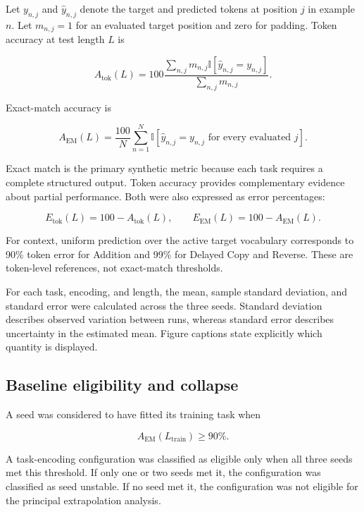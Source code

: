 \documentclass[
    author={Aanchala Ravindra Bhongade},
    supervisor={Dr. Fernando Moreno-Pino},
    degree={MSc},
    title={Length Generalisation in Transformer-Based Sequence Models: Failure Taxonomy and Mitigation Strategies},
    subtitle={},
    type={},
    year={2026}
]{dissertation}
\begin{document}
Let \(y_{n,j}\) and \(\hat{y}_{n,j}\) denote the target and predicted tokens at position \(j\) in example \(n\). Let \(m_{n,j}=1\) for an evaluated target position and zero for padding. Token accuracy at test length \(L\) is

\begin{equation}
A_{\mathrm{tok}}(L)
=
100
\frac{
\sum_{n,j}
m_{n,j}
\mathbb{I}[\hat{y}_{n,j}=y_{n,j}]
}{
\sum_{n,j}m_{n,j}
}.
\label{eq:token-accuracy}
\end{equation}

Exact-match accuracy is

\begin{equation}
A_{\mathrm{EM}}(L)
=
\frac{100}{N}
\sum_{n=1}^{N}
\mathbb{I}
\left[
\hat{y}_{n,j}=y_{n,j}
\text{ for every evaluated }j
\right].
\label{eq:exact-match-accuracy}
\end{equation}

Exact match is the primary synthetic metric because each task requires a complete structured output. Token accuracy provides complementary evidence about partial performance. Both were also expressed as error percentages:

\[
E_{\mathrm{tok}}(L)=100-A_{\mathrm{tok}}(L),
\qquad
E_{\mathrm{EM}}(L)=100-A_{\mathrm{EM}}(L).
\]

For context, uniform prediction over the active target vocabulary corresponds to 90\% token error for Addition and 99\% for Delayed Copy and Reverse. These are token-level references, not exact-match thresholds.

For each task, encoding, and length, the mean, sample standard deviation, and standard error were calculated across the three seeds. Standard deviation describes observed variation between runs, whereas standard error describes uncertainty in the estimated mean. Figure captions state explicitly which quantity is displayed.

\subsection{Baseline eligibility and collapse}
\label{sec:baseline-eligibility}

A seed was considered to have fitted its training task when

\[
A_{\mathrm{EM}}(L_{\mathrm{train}})\geq 90\%.
\]

A task-encoding configuration was classified as eligible only when all three seeds met this threshold. If only one or two seeds met it, the configuration was classified as seed unstable. If no seed met it, the configuration was not eligible for the principal extrapolation analysis.
\end{document}
